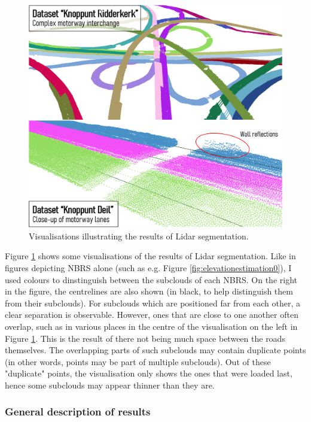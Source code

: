 \begin{figure}
    \centering
    \includegraphics[width=\linewidth]{final_report/figs/lidarsegmentation0.png}
    \caption{Visualisations illustrating the results of Lidar segmentation.}
    \label{fig:lidarsegmentation0}
\end{figure}

Figure \ref{fig:lidarsegmentation0} shows some visualisations of the results of Lidar segmentation. Like in figures depicting NBRS alone (such as e.g. Figure \ref{fig:elevationestimation0}), I used colours to dinstinguish between the subclouds of each NBRS. On the right in the figure, the centrelines are also shown (in black, to help distinguish them from their subclouds). For subclouds which are positioned far from each other, a clear separation is observable. However, ones that are close to one another often overlap, such as in various places in the centre of the visualisation on the left in Figure \ref{fig:lidarsegmentation0}. This is the result of there not being much space between the roads themselves. The overlapping parts of such subclouds may contain duplicate points (in other words, points may be part of multiple subclouds). Out of these "duplicate" points, the visualisation only shows the ones that were loaded last, hence some subclouds may appear thinner than they are.

\subsubsection{General description of results}

